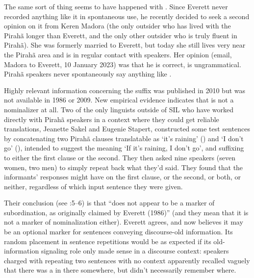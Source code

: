 \documentclass[output=paper,colorlinks,citecolor=brown
]{langscibook}
\begin{document}
The same sort of thing seems to have happened with . Since Everett
never recorded anything like it in spontaneous use, he recently decided
to seek a second opinion on it from Keren Madora (the only outsider who
has lived with the Pirah{\~a} longer than Everett, and the only other
outsider who is truly fluent in Pirah{\~a}). She was formerly married
to Everett, but today she still lives very near the Pirah{\~a} area
and is in regular contact with speakers. Her opinion (email, Madora
to Everett, 10 January 2023) was that he is correct,  is
ungrammatical. Pirah{\~a} speakers never spontaneously say anything
like .

Highly relevant information concerning the suffix \mbox{}
was published in 2010 but was not available in 1986 or 2009. New empirical
evidence indicates that \mbox{} is not a nominalizer at all.
Two of the only linguists outside of SIL who have worked directly
with Pirah{\~a} speakers in a context where they could get reliable
translations, Jeanette Sakel and Eugenie Stapert, constructed some
test sentences by concatenating two Pirah{\~a} clauses translatable
as `it's raining' () and `I don't go' (), intended to suggest the meaning `If it's raining,
I don't go', and suffixing \mbox{} to either the first
clause or the second. They then asked nine speakers (seven women, two
men) to simply repeat back what they'd said. They found that the
informants' responses might have \mbox{} on the first
clause, or the second, or both, or neither, regardless of which input
sentence they were given.

Their conclusion (see \citealt{SakeStap10}:5--6) is that
\mbox{} ``does not appear to be a marker of subordination,
as originally claimed by Everett (1986)'' (and they mean that it is
not a marker of nominalization either). Everett agrees, and now
believes it may be an optional marker for sentences conveying
discourse-old information. Its random placement in sentence repetitions
would be as expected if its old-information signaling role only made
sense in a discourse context: speakers charged with repeating two
sentences with no context apparently recalled vaguely that there was
a \mbox{} in there somewhere, but didn't necessarily
remember where.
\end{document}
